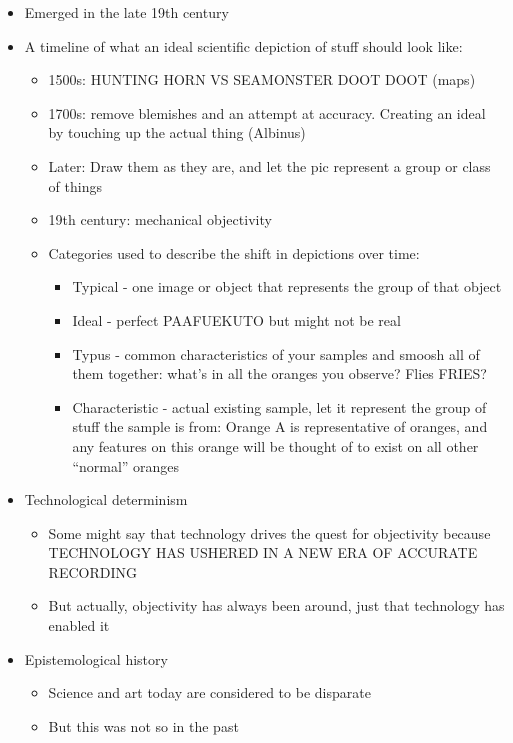 \documentclass[a4paper]{article}
\begin{document}
\begin{itemize}
	\item Emerged in the late 19th century 
	\item A timeline of what an ideal scientific depiction of stuff should look like:
	\begin{itemize}[label=$\circ$]
		\item 1500s: HUNTING HORN VS SEAMONSTER DOOT DOOT (maps)
		\item 1700s: remove blemishes and an attempt at accuracy. Creating an ideal by touching up the actual thing (Albinus)
		\item Later: Draw them as they are, and let the pic represent a group or class of things
		\item 19th century: mechanical objectivity
		\item Categories used to describe the shift in depictions over time:
		\begin{itemize}[label=\tiny$\blacksquare$]
			\item Typical - one image or object that represents the group of that object
			\item Ideal - perfect PAAFUEKUTO but might not be real
			\item Typus - common characteristics of your samples and smoosh all of them together: what's in all the oranges you observe? Flies FRIES?
			\item Characteristic - actual existing sample, let it represent the group of stuff the sample is from: Orange A is representative of oranges, and any features on this orange will be thought of to exist on all other ``normal'' oranges
		\end{itemize}
	\end{itemize}
	\item Technological determinism
	\begin{itemize}[label=$\circ$]
		\item Some might say that technology drives the quest for objectivity because TECHNOLOGY HAS USHERED IN A NEW ERA OF ACCURATE RECORDING
		\item But actually,  objectivity has always been around, just that technology has enabled it
	\end{itemize}
	\item Epistemological history
	\begin{itemize}[label=$\circ$]
		\item Science and art today are considered to be disparate
		\item But this was not so in the past

\end{itemize}
\end{itemize}
\end{document}
